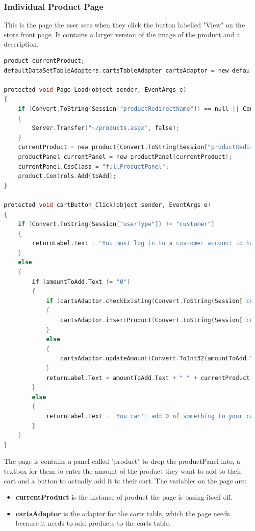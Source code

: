 ﻿\documentclass{article}
\begin{document}
    \subsubsection{Individual Product Page}
    This is the page the user sees when they click the button labelled "View" on the store front page.
    It contains a larger version of the image of the product and a description.
    \begin{lstlisting}[language=C]
product currentProduct;
defaultDataSetTableAdapters.cartsTableAdapter cartsAdaptor = new defaultDataSetTableAdapters.cartsTableAdapter();

protected void Page_Load(object sender, EventArgs e)
{
    if (Convert.ToString(Session["productRedirectName"]) == null || Convert.ToString(Session["productRedirectName"]) == "")
    {
        Server.Transfer("~/products.aspx", false);
    }
    currentProduct = new product(Convert.ToString(Session["productRedirectName"]));
    productPanel currentPanel = new productPanel(currentProduct);
    currentPanel.CssClass = "fullProductPanel";
    product.Controls.Add(toAdd);
}

protected void cartButton_Click(object sender, EventArgs e)
{
    if (Convert.ToString(Session["userType"]) != "customer")
    {
        returnLabel.Text = "You must log in to a customer account to have a cart!";
    }
    else
    {
        if (amountToAdd.Text != "0")
        {
            if (cartsAdaptor.checkExisting(Convert.ToString(Session["currentUser"]), currentProduct.productName) == null)
            {
                cartsAdaptor.insertProduct(Convert.ToString(Session["currentUser"]), currentProduct.productName, Convert.ToInt32(amountToAdd.Text));
            }
            else
            {
                cartsAdaptor.updateAmount(Convert.ToInt32(amountToAdd.Text), Convert.ToString(Session["currentUser"]), currentProduct.productName);
            }
            returnLabel.Text = amountToAdd.Text + " " + currentProduct.productName + "s added to your cart!";
        }
        else
        {
            returnLabel.Text = "You can't add 0 of something to your cart!";
        }
    }
}
    \end{lstlisting}
    The page is contains a panel called "product" to drop the productPanel into, a textbox for them to enter the amount of the product they want to add to their cart and a button to actually add it to their cart.
    The variables on the page are:
    \begin{itemize}
        \item \textbf{currentProduct} is the instance of product the page is basing itself off.
        \item \textbf{cartsAdaptor} is the adaptor for the carts table, which the page needs because it needs to add products to the carts table.
    \end{itemize}
\end{document}
